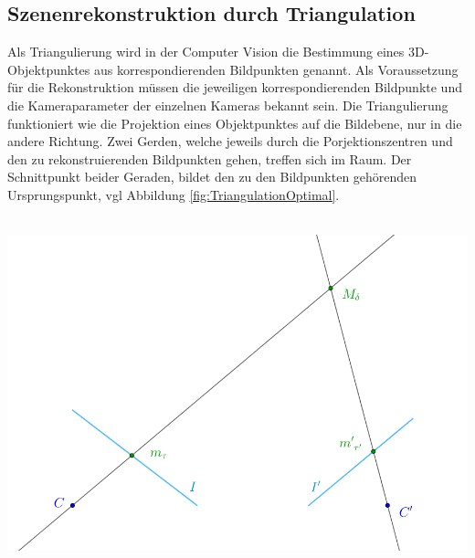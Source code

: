 
\subsection{Szenenrekonstruktion durch Triangulation}

Als Triangulierung wird in der Computer Vision die Bestimmung eines 3D-Objektpunktes aus korrespondierenden Bildpunkten genannt. Als Voraussetzung für die Rekonstruktion müssen die jeweiligen korrespondierenden Bildpunkte und die Kameraparameter der einzelnen Kameras bekannt sein. Die Triangulierung funktioniert wie die Projektion eines Objektpunktes auf die Bildebene, nur in die andere Richtung. Zwei Gerden, welche jeweils durch die Porjektionszentren und den zu rekonstruierenden Bildpunkten gehen,  treffen sich im Raum. Der Schnittpunkt beider Geraden, bildet den zu den Bildpunkten gehörenden Ursprungspunkt, vgl Abbildung \ref{fig:TriangulationOptimal}.  \\\\




\begin{minipage}{\linewidth}
	\centering
	\includegraphics[width=0.8\linewidth]{images/optimaleTriangulierung.png}
	\label{fig:TriangulationOptimal}
\end{minipage}\\ \\

